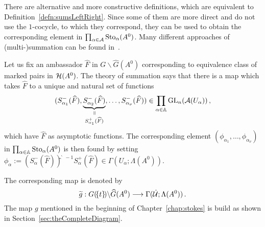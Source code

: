 There are alternative and more constructive definitions, which are equivalent to
Definition~\ref{defn:sumsLeftRight}.
Since some of them are more direct and do not use the $1$-cocycle, to which they
correspond, they can be used to obtain the corresponding
element in $\prod_{\alpha\in\mathcal{A}}\operatorname{Sto}_\alpha(A^0)$.
Many different approaches of (multi-)summation can be found in~\cite{Loday2014}.

Let us fix an ambassador $\hat F$ in $G\backslash\hat G(A^0)$ corresponding to
equivalence class of marked pairs in $\mathcal{H}(A^0)$.
The theory of summation says that there is a map which takes $\hat F$ to a
unique and natural set of functions
\[
  (S_{\alpha_1}^-(\hat F),
  \underset{S_{\alpha_1}^+(\hat F)}{
    \underset{\text{\rotatebox[origin=c]{-90}{$=$}}}{\underbrace{
        S_{\alpha_2}^-(\hat F)
      }}}
  ,\dots,S_{\alpha_\nu}^-(\hat F))\in
  \prod_{\alpha\in\A}\Gl_n(\cA(U_\alpha)) \,,
\]
which have $\hat F$ as asymptotic functions. The corresponding element
$(\phi_{\alpha_1},\dots,\phi_{\alpha_\nu})$ in
$\prod_{\alpha\in\mathbb{A}}\operatorname{Sto}_\alpha(A^0)$ is then found by setting
$\phi_\alpha:=\left(S^-_\alpha(\hat F)\right)̂^{̀-1}S^+_\alpha(\hat F)\in\Gamma(U_\alpha;\Lambda(A^0))$.
\begin{defn}\label{defn:theMapG}
  The corresponding map is denoted by
  \[
    \widetilde g:G(\!\{t\}\!)\backslash\widehat G(A^0)
    \longrightarrow
    \Gamma(\dot{\mathcal{U}};\Lambda(A^0)) \,.
  \]
  The map $g$ mentioned in the beginning of Chapter~\ref{chap:stokes} is build
  as shown in Section~\ref{sec:theCompleteDiagram}.
\end{defn}

